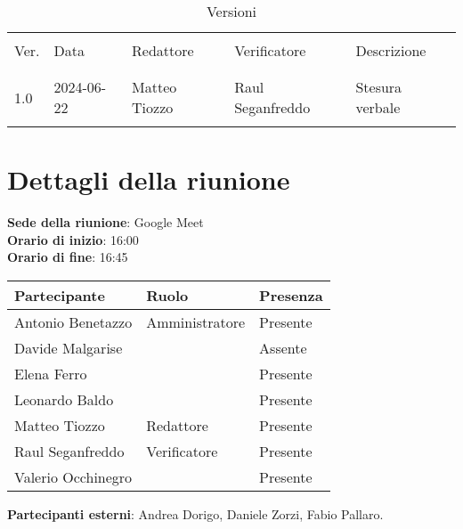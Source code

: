 \documentclass[italian,12pt]{article}
\begin{document}


\newpage



\begin{table}[!h]
	\caption{Versioni}
	\footnotesize
	\begin{center}
		\begin{tabular}{ l l l l p{6cm} }
			\hline                                                                \\[-2ex]
			Ver. & Data       & Redattore        & Verificatore & Descrizione     \\
			\\[-2ex] \hline \\[-1.5ex]
			1.0  & 2024-06-22 & Matteo Tiozzo & Raul Seganfreddo  & Stesura verbale \\
			\\[-1.5ex] \hline
		\end{tabular}
	\end{center}
\end{table}

\newpage

\tableofcontents

\newpage

\section{Dettagli della riunione}


\textbf{Sede della riunione}: Google Meet\\
\textbf{Orario di inizio}: 16:00\\
\textbf{Orario di fine}: 16:45\\

\begin{flushleft}
	\begin{table}[!h]
		\begin{tabular}{ |l|l|l| }
			\hline
			\textbf{Partecipante} & \textbf{Ruolo} & \textbf{Presenza} \\
			\hline
			Antonio Benetazzo     & Amministratore  & Presente          \\
			Davide Malgarise      &       			& Assente           \\
			Elena Ferro           & 			    & Presente          \\
			Leonardo Baldo        &                 & Presente          \\
			Matteo Tiozzo         & Redattore       & Presente          \\
			Raul Seganfreddo      & Verificatore    & Presente          \\
			Valerio Occhinegro    & 				& Presente          \\
			\hline
		\end{tabular}
	\end{table}
	\textbf{Partecipanti esterni}: Andrea Dorigo, Daniele Zorzi, Fabio Pallaro.\\
\end{flushleft}
\end{document}
